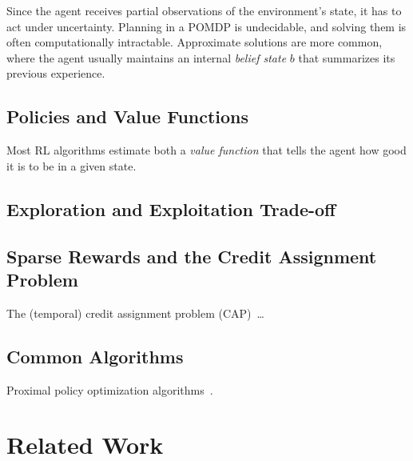 Since the agent receives partial observations of the environment's state, it has to act under uncertainty.
Planning in a POMDP is undecidable, and solving them is often computationally intractable.
Approximate solutions are more common, where the agent usually maintains an internal \textit{belief state} \(b\) that summarizes its previous experience.


\subsection{Policies and Value Functions}

Most RL algorithms estimate both a \textit{value function} that tells the agent how good it is to be in a given state.
\cite{sutton_reinforcement_2018}


\subsection{Exploration and Exploitation Trade-off}

\subsection{Sparse Rewards and the Credit Assignment Problem}



The (temporal) credit assignment problem (CAP)~\cite{minsky_cap_1961}\dots

\subsection{Common Algorithms}



Proximal policy optimization algorithms~\cite{schulman_ppo_2017}.

\section{Related Work}


